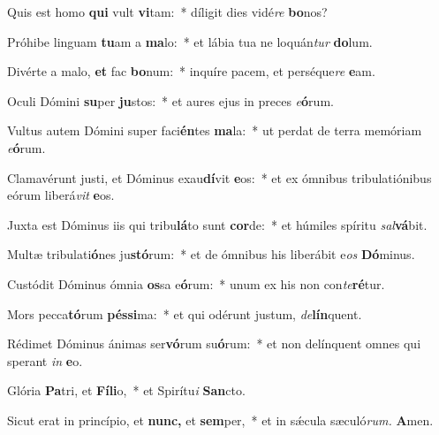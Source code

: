 \item Quis est homo \textbf{qui} vult \textbf{vi}tam:~* díligit dies vidé\tinyhspace\textit{re} \textbf{bo}nos?
\item Próhibe linguam \textbf{tu}am a \textbf{ma}lo:~* et lábia tua ne loquán\textit{tur} \textbf{do}lum.
\item Divérte a malo, \textbf{et} fac \textbf{bo}num:~* inquíre pacem, et perséque\tinyhspace\textit{re} \textbf{e}am.
\item Oculi Dómini \textbf{su}per \textbf{ju}stos:~* et aures ejus in preces \textit{e}\textbf{ó}rum.
\item Vultus autem Dómini super faci\textbf{én}tes \textbf{ma}la:~* ut perdat de terra memóriam \textit{e}\textbf{ó}rum.
\item Clamavérunt justi, et Dóminus exau\textbf{dí}vit \textbf{e}os:~* et ex ómnibus tribulatiónibus eórum liberá\textit{vit} \textbf{e}os.
\item Juxta est Dóminus iis qui tribu\textbf{lá}to sunt \textbf{cor}de:~* et húmiles spíritu \textit{sal}\textbf{vá}bit.
\item Multæ tribulati\textbf{ó}nes ju\textbf{stó}rum:~* et de ómnibus his liberábit e\tinyhspace\textit{os} \textbf{Dó}minus.
\item Custódit Dóminus ómnia \textbf{os}sa e\textbf{ó}rum:~* unum ex his non con\tinyhspace\textit{te}\textbf{ré}tur.
\item Mors pecca\textbf{tó}rum \textbf{pés}\textbf{si}ma:~* et qui odérunt justum, \textit{de}\textbf{lín}quent.
\item Rédimet Dóminus ánimas ser\textbf{vó}rum su\textbf{ó}rum:~* et non delínquent omnes qui sperant \textit{in} \textbf{e}o.
\item Glória \textbf{Pa}tri, et \textbf{Fí}\textbf{li}o,~* et Spirítu\textit{i} \textbf{San}cto.
\item Sicut erat in princípio, et \textbf{nunc,} et \textbf{sem}per,~* et in sǽcula sæculó\textit{rum.} \textbf{A}men.

